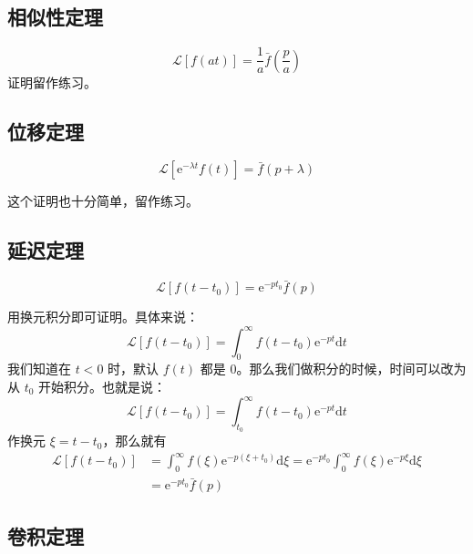 \subsection{相似性定理}
\begin{equation}
\mathscr{L}[f(at)]=\frac{1}{a} \bar{f}\left(\frac{p}{a}\right)
\end{equation}
证明留作练习。

\subsection{位移定理}
\begin{equation}
\mathscr{L}[\mathrm{e}^{-\lambda t} f(t)]= \bar{f}(p+\lambda)
\end{equation}

这个证明也十分简单，留作练习。

\subsection{延迟定理}
\begin{equation}
\mathscr{L}\left [f\left(t-t_{0}\right)\right] =\mathrm{e}^{-p t_{0}} \bar f(p)
\end{equation}

用换元积分即可证明。具体来说：
\begin{equation}
\mathscr L\left [f\left(t-t_{0}\right)\right] =\int_{0}^{\infty} f\left(t-t_{0}\right) \mathrm{e}^{-p t} \mathrm{d} t
\end{equation}
我们知道在 $t<0$ 时，默认 $f(t)$ 都是 $0$。那么我们做积分的时候，时间可以改为从 $t_0$ 开始积分。也就是说：
\begin{equation}
\mathscr L\left [f\left(t-t_{0}\right)\right] =\int_{t_0}^{\infty} f\left(t-t_{0}\right) \mathrm{e}^{-p t} \mathrm{d} t
\end{equation}
作换元 $\xi=t-t_0$，那么就有
\begin{equation}
\begin{aligned} \mathscr L\left[f\left(t-t_{0}\right)\right] &=\int_{0}^{\infty} f(\xi) \mathrm{e}^{-p\left(\xi+t_{0}\right)} \mathrm{d} \xi=\mathrm{e}^{-p t_{0}} \int_{0}^{\infty} f(\xi) \mathrm{e}^{-p \xi} \mathrm{d} \xi \\ &=\mathrm{e}^{-p t_{0}} \bar{f}(p) \end{aligned}
\end{equation}

\subsection{卷积定理}

